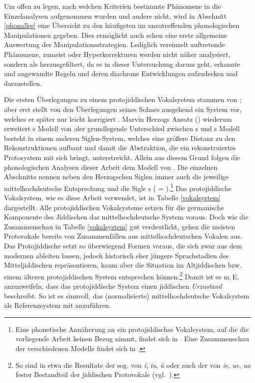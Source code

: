  
Um offen zu legen, nach welchen Kriterien bestimmte Phänomene in die Einzelanalysen aufgenommen wurden und andere nicht, wird in Abschnitt \ref{phonalles} eine Übersicht zu den häufigsten im \hai{{\LiJi}} anzutreffenden phonologischen Manipulationen gegeben. Dies ermöglicht auch schon eine erste allgemeine Auswertung der Manipulationsstrategien. Lediglich vereinzelt auftretende Phänomene, zumeist  oder Hyperkorrekturen werden nicht näher analysiert, sondern als  herausgefiltert, da es in dieser Untersuchung darum geht, erkannte und angewandte Regeln und deren diachrone Entwicklungen aufzudecken und darzustellen.   
 
 Die ersten Überlegungen zu einem protojiddischen Vokalsystem stammen von \cite[251–254]{WeinreichU1958}; aber erst \cite{Weinreich1960} stellt von den Überlegungen seines Sohnes ausgehend ein System vor, welches er später nur leicht korrigiert \parencite[658–718]{Weinreich1973}. Marvin Herzogs Ansatz (\citeyear{Herzog1965}) wiederum erweitert \citeauthor{Weinreich1960}s Modell von \citeyear{Weinreich1960};der grundlegende Unterschied zwischen \citeauthor{Weinreich1960}s und \citeauthor{Herzog1965}s Modell besteht in einem anderen Siglen-System, welches eine größere Distanz zu den {\urj} Rekonstruktionen aufbaut und damit die Abstraktion, die ein rekonstruiertes Protosystem mit sich bringt, unterstreicht. Allein aus diesem Grund folgen die phonologischen Analysen dieser Arbeit dem Modell von  \cite[161–205]{Herzog1965}. Die einzelnen Abschnitte nennen neben den Herzogschen Siglen immer auch die jeweilige mittelhochdeutsche Entsprechung und die Sigle \citeauthor{Weinreich1973}s  (\citealt[658–718]{Weinreich1973} = ).\footnote{Eine phonetische Annäherung an ein protojiddisches Vokalsystem, auf die die vorliegende Arbeit keinen Bezug nimmt, findet sich in \cite{Jacobs1990}. Eine Zusammenschau der verschiedenen Modelle findet sich in \cite[insbes. S.\, 86 Tabelle 18]{Beider2010}.} Das protojiddische Vokalsystem, wie es diese Arbeit verwendet, ist in Tabelle \ref{vokalsystem} dargestellt. Alle protojiddischen Vokalsysteme setzen für die germanische Komponente des Jiddischen das mittelhochdeutsche System voraus. Doch wie die Zusammenschau in Tabelle \ref{vokalsystem} gut verdeutlicht, gehen die meisten Protovokale bereits von Zusammenfällen aus mittelhochdeutschen Vokalen aus. Das Protojiddische setzt so überwiegend Formen voraus, die sich zwar aus dem modernen \hai{{\OJ}}  ableiten lassen, jedoch historisch eher jüngere Sprachstadien des Mitteljiddischen repräsentieren, kaum aber die Situation im Altjiddischen bzw. einem älteren protojiddischen System entsprechen können.\footnote{So sind in etwa die Resultate der sog.  von {\mhd} \textit{î}, \textit{iu}, \textit{û} oder auch der 
 von {\mhd} \textit{ie}, \textit{ue}, \textit{uo} fester Bestandteil der jiddischen Protovokale (vgl.\, \citealt[§L17]{Paul2007}).} Damit ist es m.\,E. anzuzweifeln, dass das protojiddische System einen jiddischen \textit{Urzustand} beschreibt. So ist es sinnvoll, das (normalisierte) mittelhochdeutsche Vokalsystem als Referenzsystem mit anzuführen.
 
